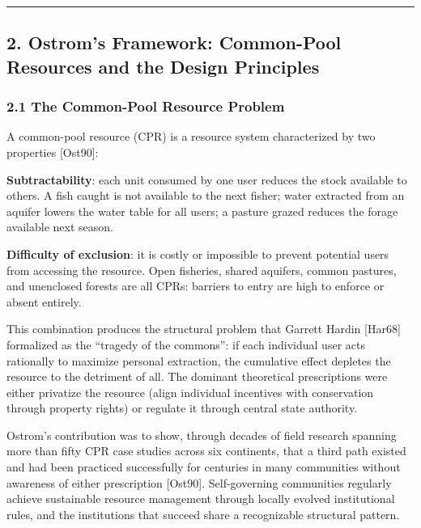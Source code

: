 \documentclass[
  11pt,
  letterpaper,
]{article}
\begin{document}
\begin{center}\rule{0.5\linewidth}{0.5pt}\end{center}

\subsection{2. Ostrom's Framework: Common-Pool Resources and the Design
Principles}\label{ostroms-framework-common-pool-resources-and-the-design-principles}

\subsubsection{2.1 The Common-Pool Resource
Problem}\label{the-common-pool-resource-problem}

A common-pool resource (CPR) is a resource system characterized by two
properties {[}Ost90{]}:

\textbf{Subtractability}: each unit consumed by one user reduces the
stock available to others. A fish caught is not available to the next
fisher; water extracted from an aquifer lowers the water table for all
users; a pasture grazed reduces the forage available next season.

\textbf{Difficulty of exclusion}: it is costly or impossible to prevent
potential users from accessing the resource. Open fisheries, shared
aquifers, common pastures, and unenclosed forests are all CPRs: barriers
to entry are high to enforce or absent entirely.

This combination produces the structural problem that Garrett Hardin
{[}Har68{]} formalized as the ``tragedy of the commons'': if each
individual user acts rationally to maximize personal extraction, the
cumulative effect depletes the resource to the detriment of all. The
dominant theoretical prescriptions were either privatize the resource
(align individual incentives with conservation through property rights)
or regulate it through central state authority.

Ostrom's contribution was to show, through decades of field research
spanning more than fifty CPR case studies across six continents, that a
third path existed and had been practiced successfully for centuries in
many communities without awareness of either prescription {[}Ost90{]}.
Self-governing communities regularly achieve sustainable resource
management through locally evolved institutional rules, and the
institutions that succeed share a recognizable structural pattern.
\end{document}
